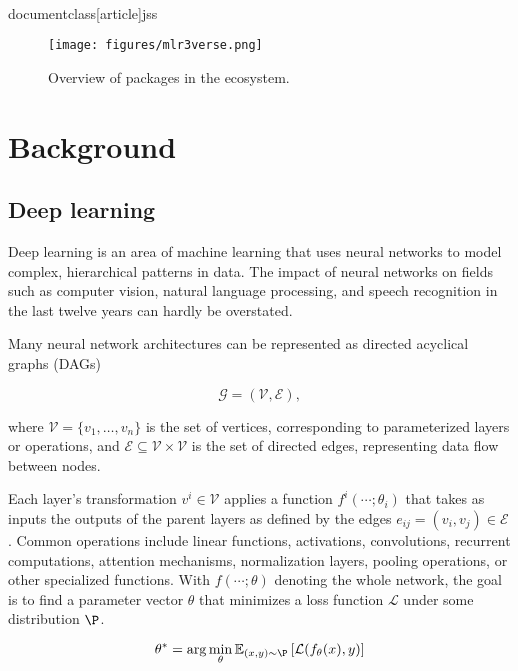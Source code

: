 \\documentclass[article]{jss}
\theoremstyle{definition}
\begin{document}
\begin{figure}
    \centering
    \texttt{[image: figures/mlr3verse.png]}
    \caption{Overview of packages in the \mlrt{} ecosystem.}
    \label{fig:mlr3-ecosystem}
\end{figure}

\section{Background}\label{sec:background}


\subsection{Deep learning}\label{sec:background_dl}

Deep learning is an area of machine learning that uses neural networks to model complex, hierarchical patterns in data.
The impact of neural networks on fields such as computer vision, natural language processing, and speech recognition in the last twelve years can hardly be overstated.

Many neural network architectures can be represented as directed acyclical graphs (DAGs)

\begin{equation}
    \mathcal{G} = (\mathcal{V}, \mathcal{E}),
\end{equation}

where $\mathcal{V} = \{v_1, \ldots, v_n\}$ is the set of vertices, corresponding to parameterized layers or operations, and $\mathcal{E} \subseteq \mathcal{V} \times \mathcal{V}$ is the set of directed edges, representing data flow between nodes.

Each layer's transformation $v^i \in \mathcal{V}$ applies a function $f^i(\cdots; \theta_i)$ that takes as inputs the outputs of the parent layers as defined by the edges $e_{ij} = (v_i, v_j) \in \mathcal{E}$.
Common operations include linear functions, activations, convolutions, recurrent computations, attention mechanisms, normalization layers, pooling operations, or other specialized functions.
With $f(\cdots; \theta)$ denoting the whole network, the goal is to find a parameter vector $\theta$ that minimizes a loss function $\mathcal{L}$ under some distribution $\P$.

\begin{equation}
\theta^* = \arg \min_{\theta} \mathbb{E}_{(x, y) \sim \P} \left[ \mathcal{L}(f_{\theta}(x), y) \right]
\end{equation}
\end{document}
